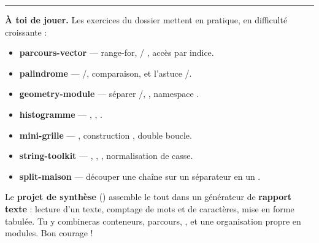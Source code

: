 \documentclass[11pt]{article}
\begin{document}
\bigskip\hrule\bigskip
\noindent\textbf{À toi de jouer.} Les exercices du dossier 
mettent en pratique, en difficulté croissante :

\begin{itemize}[noitemsep]
    \item \textbf{parcours-vector} — range-for,  /
          , accès par indice.
    \item \textbf{palindrome} — /\code{[]}, comparaison, et l'astuce
          /.
    \item \textbf{geometry-module} — séparer /,
          , namespace .
    \item \textbf{histogramme} — , ,
          .
    \item \textbf{mini-grille} — , construction
          , double boucle.
    \item \textbf{string-toolkit} — , , ,
          normalisation de casse.
    \item \textbf{split-maison} — découper une chaîne sur un séparateur en un
          .
\end{itemize}

Le \textbf{projet de synthèse} () assemble le tout dans un
générateur de \textbf{rapport texte} : lecture d'un texte, comptage de mots et
de caractères, mise en forme tabulée. Tu y combineras conteneurs, parcours,
,  et une organisation propre en modules.
Bon courage !
\end{document}

